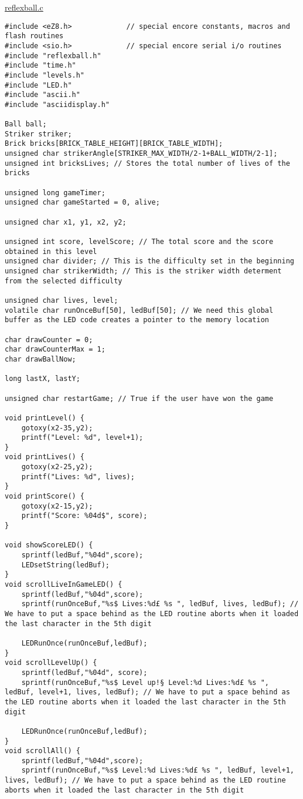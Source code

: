 \underline{reflexball.c}
\begin{lstlisting}
#include <eZ8.h>             // special encore constants, macros and flash routines
#include <sio.h>             // special encore serial i/o routines
#include "reflexball.h"
#include "time.h"
#include "levels.h"
#include "LED.h"
#include "ascii.h"
#include "asciidisplay.h"

Ball ball;
Striker striker;
Brick bricks[BRICK_TABLE_HEIGHT][BRICK_TABLE_WIDTH];
unsigned char strikerAngle[STRIKER_MAX_WIDTH/2-1+BALL_WIDTH/2-1];
unsigned int bricksLives; // Stores the total number of lives of the bricks

unsigned long gameTimer;
unsigned char gameStarted = 0, alive;

unsigned char x1, y1, x2, y2;

unsigned int score, levelScore; // The total score and the score obtained in this level
unsigned char divider; // This is the difficulty set in the beginning
unsigned char strikerWidth; // This is the striker width determent from the selected difficulty

unsigned char lives, level;
volatile char runOnceBuf[50], ledBuf[50]; // We need this global buffer as the LED code creates a pointer to the memory location

char drawCounter = 0;
char drawCounterMax = 1;
char drawBallNow;

long lastX, lastY;

unsigned char restartGame; // True if the user have won the game

void printLevel() {
	gotoxy(x2-35,y2);
	printf("Level: %d", level+1);
}
void printLives() {
	gotoxy(x2-25,y2);
	printf("Lives: %d", lives);	
}
void printScore() {
	gotoxy(x2-15,y2);
	printf("Score: %04d$", score);
}

void showScoreLED() {
	sprintf(ledBuf,"%04d",score);
	LEDsetString(ledBuf);
}
void scrollLiveInGameLED() {
	sprintf(ledBuf,"%04d",score);
	sprintf(runOnceBuf,"%s$ Lives:%d£ %s ", ledBuf, lives, ledBuf); // We have to put a space behind as the LED routine aborts when it loaded the last character in the 5th digit
	
	LEDRunOnce(runOnceBuf,ledBuf);
}
void scrollLevelUp() {
	sprintf(ledBuf,"%04d", score);
	sprintf(runOnceBuf,"%s$ Level up!§ Level:%d Lives:%d£ %s ", ledBuf, level+1, lives, ledBuf); // We have to put a space behind as the LED routine aborts when it loaded the last character in the 5th digit
	
	LEDRunOnce(runOnceBuf,ledBuf);
}
void scrollAll() {
	sprintf(ledBuf,"%04d",score);
	sprintf(runOnceBuf,"%s$ Level:%d Lives:%d£ %s ", ledBuf, level+1, lives, ledBuf); // We have to put a space behind as the LED routine aborts when it loaded the last character in the 5th digit
	

\end{lstlisting}
